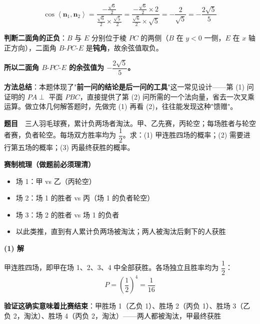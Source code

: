 \[\cos\left\langle\boldsymbol n_1,\boldsymbol n_2\right\rangle=\frac{-\frac{\sqrt6}2}{\frac{\sqrt6}2\times\frac{\sqrt5}2}=\frac{-\frac{\sqrt6}2\times2}{\frac{\sqrt6}2\times\sqrt5}=-\frac2{\sqrt5}=-\frac{2\sqrt5}5\]

\textbf{判断二面角的正负}：$B$ 与 $E$ 分别位于棱 $PC$ 的两侧（$B$ 在 $y<0$ 一侧，$E$ 在 $x$ 轴正方向），二面角 $B\text{-}PC\text{-}E$ 是\textbf{钝角}，故余弦值取负。

\textbf{所以二面角 $B\text{-}PC\text{-}E$ 的余弦值为 $-\dfrac{2\sqrt5}5$。}

\begin{gktip}
\textbf{方法总结}：本题体现了"\textbf{前一问的结论是后一问的工具}"这一常见设计——第 (1) 问证明的 $PA\perp$ 平面 $PBC$，直接提供了第 (2) 问所需的一个法向量，省去一次叉乘运算。做立体几何解答题时，先做完 (1) 再看 (2)，往往能发现这种"馈赠"。
\end{gktip}

\par\medskip


\textbf{题目}　三人羽毛球赛，累计负两场者淘汰。甲、乙先赛，丙轮空；每场胜者与轮空者赛，负者轮空。每场双方胜率均为 $\dfrac12$。求：(1) 甲连胜四场的概率；(2) 需要进行第五场的概率；(3) 丙最终获胜的概率。

\par\medskip

\textbf{赛制梳理（做题前必须理清）}

\begin{itemize}
\item 场 1：甲 vs 乙（丙轮空）
\item 场 2：场 1 的胜者 vs 丙（场 1 的负者轮空）
\item 场 3：场 2 的胜者 vs 场 1 的负者
\item 以此类推，直到有人累计负两场被淘汰；两人被淘汰后剩下的人获胜
\end{itemize}

\par\medskip

\textbf{(1) 解}

甲连胜四场，即甲在场 1、2、3、4 中全部获胜。各场独立且胜率均为 $\dfrac12$：
\[P=\left(\frac12\right)^{4}=\frac1{16}\]

\textbf{验证这确实意味着比赛结束}：甲胜场 1（乙负 1）、胜场 2（丙负 1）、胜场 3（乙负 2，淘汰）、胜场 4（丙负 2，淘汰）——两人都被淘汰，甲最终获胜 

\par\medskip

